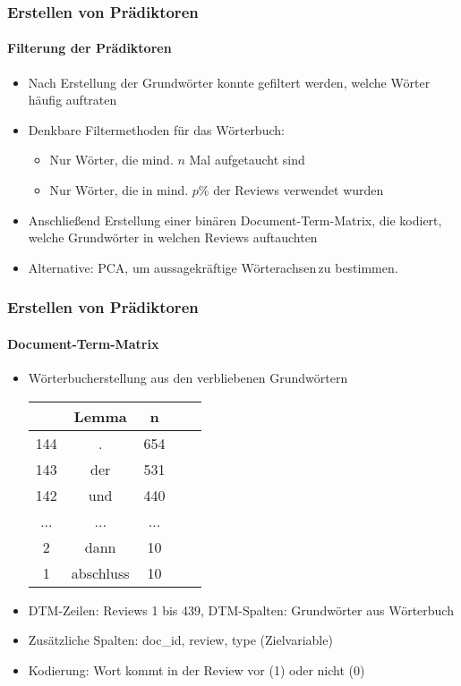 \begin{frame}
\frametitle{Erstellen von Prädiktoren}
\framesubtitle{Filterung der Prädiktoren}
\begin{itemize}\itemsep12pt
\item Nach Erstellung der Grundwörter konnte gefiltert werden, welche Wörter häufig auftraten
\item Denkbare Filtermethoden für das Wörterbuch:
\begin{itemize}
\item Nur Wörter, die mind. $n$ Mal aufgetaucht sind 
\item Nur Wörter, die in mind. $p\%$ der Reviews verwendet wurden
\end{itemize} 
\item Anschließend Erstellung einer binären Document-Term-Matrix, die kodiert, welche Grundwörter in welchen Reviews auftauchten
\item Alternative: PCA, um aussagekräftige \glqq Wörterachsen\grqq \,zu bestimmen.
\end{itemize}
\end{frame}

\begin{frame}
\frametitle{Erstellen von Prädiktoren}
\framesubtitle{Document-Term-Matrix}
\begin{itemize}\itemsep12pt
\item Wörterbucherstellung aus den verbliebenen Grundwörtern\\
\begin{center}
\begin{tabular}{|c|c|c|c|c|}
\hline
		& Lemma 	& n	\\
\hline
144 	& .		& 654\\
143	 	& der	& 531\\
142 	& und	& 440\\
...		& ...	& ...\\
2		& dann & 10\\
1		& abschluss & 10\\
\hline
\end{tabular}
 \end{center}

\item DTM-Zeilen: Reviews 1 bis 439, DTM-Spalten: Grundwörter aus Wörterbuch
\item Zusätzliche Spalten: doc\_id, review, type (Zielvariable) 
\item Kodierung: Wort kommt in der Review vor (1) oder nicht (0)
\end{itemize}
\end{frame}

